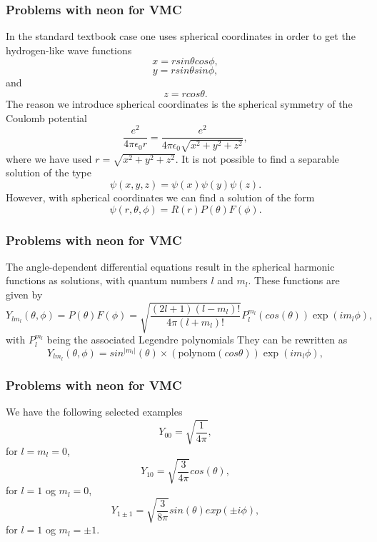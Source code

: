 \frame
{
  \frametitle{Problems with neon for VMC}
\begin{small}
{\scriptsize
In the standard textbook case one uses spherical coordinates  in order to get the hydrogen-like wave functions
     \[
        x=rsin\theta cos\phi,  
      \]
      \[
        y=rsin\theta sin\phi,
     \]
and
     \[
        z=rcos\theta.
     \]
The reason we introduce spherical coordinates is the spherical symmetry of the Coulomb potential
\[
    \frac{e^2}{4\pi\epsilon_0r}=\frac{e^2}{4\pi\epsilon_0\sqrt{x^2+y^2+z^2}},
\]
where we have used $r=\sqrt{x^2+y^2+z^2}$. 
It is not possible to find a separable solution of the type
\[
    \psi(x,y,z)=\psi(x)\psi(y)\psi(z).
\]
However, with spherical coordinates we can find a solution
of the form
\[
   \psi(r,\theta,\phi)=R(r)P(\theta)F(\phi).
\]
}
\end{small}
}




\frame
{
  \frametitle{Problems with neon for VMC}
\begin{small}
{\scriptsize
The angle-dependent differential equations result in the spherical harmonic functions as
solutions, with quantum numbers $l$ and $m_l$.
These functions are given by
\[
    Y_{lm_l}(\theta,\phi)=P(\theta)F(\phi)=\sqrt{\frac{(2l+1)(l-m_l)!}{4\pi (l+m_l)!}}
                      P_l^{m_l}(cos(\theta))\exp{(im_l\phi)},
\]
with $P_l^{m_l}$ being the associated Legendre polynomials
They can be rewritten as 
\[
   Y_{lm_l}(\theta,\phi)=sin^{|m_l|}(\theta) \times (\mathrm{polynom}(cos\theta))\exp{(im_l\phi)},
\]
}
\end{small}
}


\frame
{
  \frametitle{Problems with neon for VMC}
\begin{small}
{\scriptsize
We have the following selected examples
\[
   Y_{00}=\sqrt{\frac{1}{4\pi}},
\]
for $l=m_l=0$, 
\[
   Y_{10}=\sqrt{\frac{3}{4\pi}}cos(\theta),
\]
for $l=1$ og $m_l=0$, 
\[
   Y_{1\pm 1}=\sqrt{\frac{3}{8\pi}}sin(\theta)exp(\pm i\phi),
\]
for  $l=1$ og $m_l=\pm 1$. 
}
\end{small}
}



